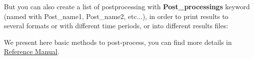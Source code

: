 But you can also create a list of postprocessing with \textbf{Post\_processings} keyword (named with Post\_name1, Post\_name2, etc...), in order to print results to several formats or with different time periods, or into different results files:

    \begin{center}
    \end{center}

We present here basic methods to post-process, you can find more details in \href{TRUST_Reference_Manual.pdf\#postraitements}{\trust Reference Manual}.\\


